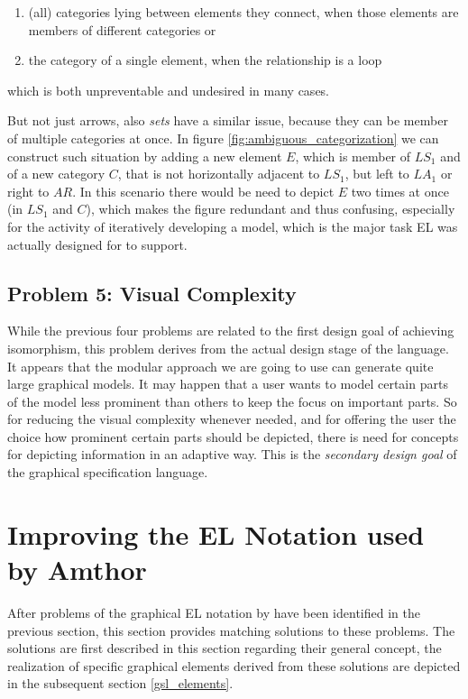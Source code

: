 \documentclass[twoside, openright, 12pt]{book}
\begin{document}
\begin{enumerate}[label=\alph*)]
\item (all) categories lying between elements they connect, when those elements are members of different categories or 
\item the category of a single element, when the relationship is a loop
\end{enumerate}

\noindent
which is both unpreventable and undesired in many cases.

But not just arrows, also \textit{sets} have a similar issue, because they can be member of multiple categories at once.
In figure \ref{fig:ambiguous_categorization} we can construct such situation by adding a new element $E$, which is member of $\mathit{LS}_1$ and of a new category $C$, that is not horizontally adjacent to $\mathit{LS}_1$, but left to $\mathit{LA}_1$ or right to $\mathit{AR}$.
In this scenario there would be need to depict $E$ two times at once (in $\mathit{LS}_1$ and $C$), which makes the figure redundant and thus confusing, especially for the activity of iteratively developing a model, which is the major task EL was actually designed for to support.\\



\subsection{Problem 5: Visual Complexity}
While the previous four problems are related to the first design goal of achieving isomorphism, this problem derives from the actual design stage of the language.
It appears that the modular approach we are going to use can generate quite large graphical models.
It may happen that a user wants to model certain parts of the model less prominent than others to keep the focus on important parts.
So for reducing the visual complexity whenever needed, and for offering the user the choice how prominent certain parts should be depicted, there is need for concepts for depicting information in an adaptive way.
This is the \textit{secondary design goal} of the graphical specification language.



\section{Improving the EL Notation used by Amthor}
\label{improving_notation}
After problems of the graphical EL notation by \cite{Amthor18} have been identified in the previous section, this section provides matching solutions to these problems.
The solutions are first described in this section regarding their general concept, the realization of specific graphical elements derived from these solutions are depicted in the subsequent section \ref{gsl_elements}.
\end{document}

